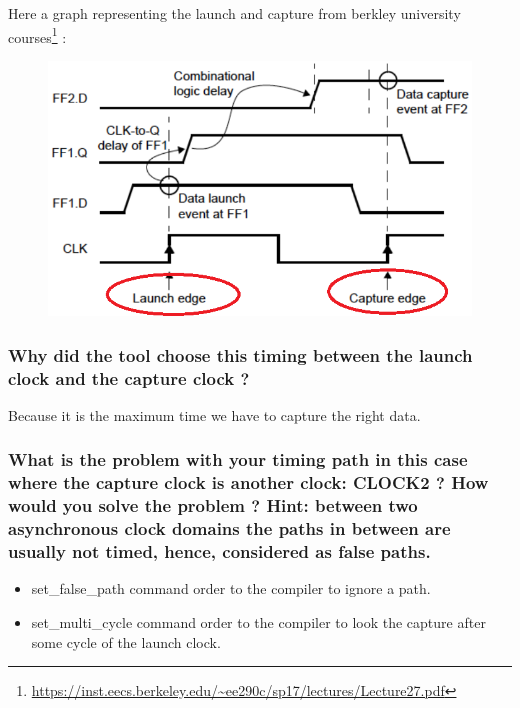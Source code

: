 \documentclass[11pt,a4paper,sans,dvipsnames]{report}
\begin{document}
	Here a graph representing the launch and capture from berkley university courses\footnote{\url{https://inst.eecs.berkeley.edu/~ee290c/sp17/lectures/Lecture27.pdf}} :
	\begin{figure}[h!]
		\centering
		\includegraphics[width=0.55\linewidth]{images/launch_capture.png}
		\label{fig:launch_capture_graph}
	\end{figure}

	\begin{figure}[h!]
		
		\label{fig:launch_capture}
	\end{figure}

	\subsubsection*{Why did the tool choose this timing between the launch clock and the capture clock ?}

	Because it is the maximum time we have to capture the right data.

	\subsubsection*{What is the problem with your timing path in this case where the capture clock is another clock: CLOCK2 ? How would you solve the problem ? Hint: between two asynchronous clock domains the paths in between are usually not timed, hence, considered as false paths.}

	\begin{itemize}
		\item set\_false\_path command order to the compiler to ignore a path.
		\item set\_multi\_cycle command order to the compiler to look the capture after some cycle of the launch clock. 
	\end{itemize}
\end{document}
